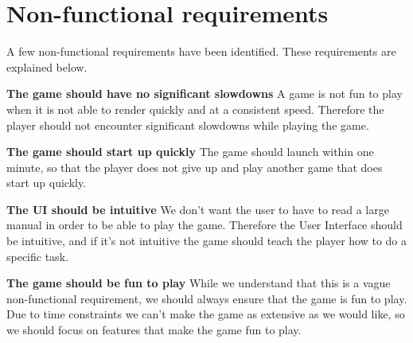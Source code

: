 \section{Non-functional requirements}
A few non-functional requirements have been identified. These requirements are explained below.

\textbf{The game should have no significant slowdowns} \newline
A game is not fun to play when it is not able to render quickly and at a consistent speed. Therefore the player should not encounter significant slowdowns while playing the game.

\textbf{The game should start up quickly} \newline
The game should launch within one minute, so that the player does not give up and play another game that does start up quickly.

\textbf{The UI should be intuitive} \newline
We don't want the user to have to read a large manual in order to be able to play the game. Therefore the User Interface should be intuitive, and if it's not intuitive the game should teach the player how to do a specific task.

\textbf{The game should be fun to play} \newline
While we understand that this is a vague non-functional requirement, we should always ensure that the game is fun to play. Due to time constraints we can't make the game as extensive as we would like, so we should focus on features that make the game fun to play.